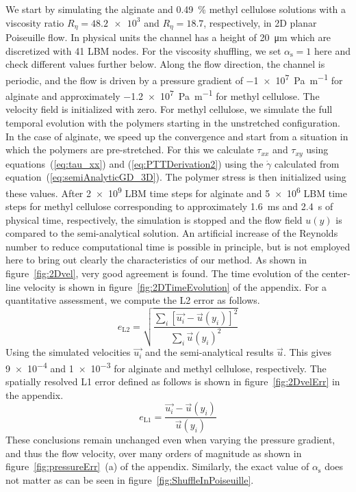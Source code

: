 \documentclass[a4paper,12pt]{scrartcl}
\begin{document}
We start by simulating the alginate and \SI{0.49}{\percent} methyl cellulose solutions with a viscosity ratio $R_\eta = \num{48.2e3}$ and $R_\eta = \num{18.7}$, respectively, in 2D planar Poiseuille flow.
In physical units the channel has a height of \SI{20}{\micro\meter} which are discretized with 41 LBM nodes.
For the viscosity shuffling, we set $\alpha_\text{s} = 1$ here and check different values further below.
Along the flow direction, the channel is periodic, and the flow is driven by a pressure gradient of \SI{-1e7}{\pascal\per\meter} for alginate and  approximately \SI{-1.2e7}{\pascal\per\meter} for methyl cellulose.
The velocity field is initialized with zero.
For methyl cellulose, we simulate the full temporal evolution with the polymers starting in the unstretched configuration.
In the case of alginate, we speed up the convergence and start from a situation in which the polymers are pre-stretched. For this we calculate $\tau_{xx}$ and $\tau_{xy}$ using equations~(\ref{eq:tau_xx}) and (\ref{eq:PTTDerivation2}) using the $\dot{\gamma}$ calculated from equation~(\ref{eq:semiAnalyticGD_3D}). The polymer stress is then initialized using these values.
After \num{2e9} LBM time steps for alginate and \num{5e6} LBM time steps for methyl cellulose corresponding to approximately \SI{1.6}{\milli\second} and \SI{2.4}{\second} of physical time, respectively, the simulation is stopped and the flow field $u(y)$ is compared to the semi-analytical solution.
An artificial increase of the Reynolds number to reduce computational time is possible in principle, but is not employed here to bring out clearly the characteristics of our method.
As shown in figure~\ref{fig:2Dvel}, very good agreement is found.
The time evolution of the center-line velocity is shown in figure~\ref{fig:2DTimeEvolution} of the appendix.
For a quantitative assessment, we compute the L2 error as follows.
\begin{equation}
	e_\text{L2} = \sqrt{\frac{\sum_i\left[\vec{u_i} - \vec{u}\left(y_i\right)\right]^2}{\sum_i\vec{u}\left(y_i\right)^2}}
\end{equation}
Using the simulated velocities $\vec{u_i}$ and the semi-analytical results $\vec{u}$. This gives \num{9e-4} and \num{1e-3} for alginate and methyl cellulose, respectively.
The spatially resolved L1 error defined as follows is shown in figure~\ref{fig:2DvelErr} in the appendix.
\begin{equation}
	e_\text{L1} = \frac{\vec{u_i} - \vec{u}\left(y_i\right)}{\vec{u}\left(y_i\right)}
\end{equation}
These conclusions remain unchanged even when varying the pressure gradient, and thus the flow velocity, over many orders of magnitude as shown in figure~\ref{fig:pressureErr}~(a) of the appendix.
Similarly, the exact value of $\alpha_\text{s}$ does not matter as can be seen in figure~\ref{fig:ShuffleInPoiseuille}.
\end{document}
